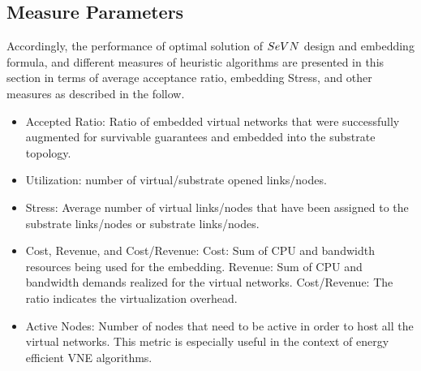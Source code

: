 \subsection{Measure Parameters}


Accordingly, the performance of optimal solution of $SeVN$ design and embedding formula, and different measures of heuristic algorithms are presented in this section in terms of average acceptance ratio, embedding Stress, and other measures as described in the follow.
\begin{itemize}
  \item Accepted Ratio: Ratio of embedded virtual networks that were successfully augmented for survivable guarantees and embedded into the substrate topology.
  \item Utilization:  number of virtual/substrate opened links/nodes.
  \item Stress: Average number of virtual links/nodes that have been assigned to the substrate links/nodes or  substrate links/nodes.
  \item Cost, Revenue, and Cost/Revenue: Cost: Sum of CPU and bandwidth resources being used for the embedding. Revenue: Sum of CPU and bandwidth demands realized for the virtual networks. Cost/Revenue: The ratio indicates the virtualization overhead.
 \item Active Nodes: Number of nodes that need to be active in order to host all the virtual networks. This metric is especially useful in the context of energy efficient VNE algorithms.
\end{itemize}

